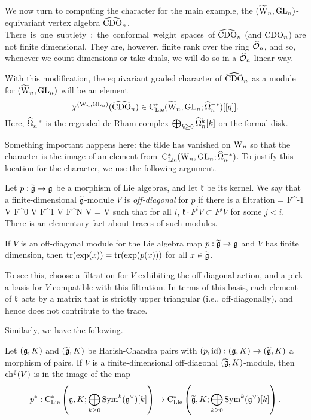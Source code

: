 \subsubsection{} 

We now turn to computing the character for the main example, 
the $(\widetilde{{{\rm W}}}_n,{\rm GL}_n)$-equivariant vertex algebra $\widehat{\rm CDO}_n$. 
\si
There is one subtlety: the conformal weight spaces of $\widehat{\rm CDO}_n$ (and ${\rm CDO}_n$) are not finite dimensional. 
They are, however, finite rank over the ring $\widehat{\mathcal O}_n$, 
and so, whenever we count dimensions or take duals, we will do so in a $\widehat{\mathcal O}_n$-linear way.

With this modification, the equivariant graded character of $\widehat{\rm CDO}_n$ as a module for $(\widetilde{{{\rm W}}}_n, {\rm GL}_n)$ will be an element 
\[
\chi^{({{\rm W}_n}, {\rm GL}_n)} (\widehat{\rm CDO}_n) \in {\rm C}_{{\rm Lie}}^*(\widetilde{{{\rm W}}}_n , {\rm GL}_n ; \widehat{\Omega}^{-*}_n)[[q]]. 
\]
Here, $\widehat{\Omega}^{-*}_n$ is the regraded de Rham complex $\bigoplus_{k \geq 0} \widehat{\Omega}^k_n [k]$ on the formal disk.  

Something important happens here: the tilde has vanished on ${{\rm W}_n}$ so that the character is the image of an element from~${\rm C}_{{\rm Lie}}^*({{\rm W}_n} , {\rm GL}_n ; \widehat{\Omega}^{-*}_n)$.
To justify this location for the character, we use the following argument.

Let $p : \widetilde{\mathfrak g} \to \mathfrak g$ be a morphism of Lie algebras, and let $\mathfrak{k}$ be its kernel. 
We say that a finite-dimensional $\widetilde{\mathfrak g}$-module $V$ is {\em off-diagonal} for $p$ if there is a filtration 
 = F^{-1} V \subset F^0 V \subset F^1 V \subset \cdots \subset F^N V = V
\een
such that for all $i$, $\mathfrak{k} \cdot F^i V \subset F^{j} V$ for some $j < i$. 
There is an elementary fact about traces of such modules.

\begin{lemma}
If $V$ is an off-diagonal module for the Lie algebra map $p : \widetilde{\mathfrak g} \to \mathfrak g$ and $V$ has finite dimension, 
then ${\rm tr}(\exp(x)) = \operatorname{tr}(\exp(p(x)))$ for all $x \in \widetilde{\mathfrak g}$. 
\end{lemma}

To see this, choose a filtration for $V$ exhibiting the off-diagonal action, and a pick a basis for $V$ compatible with this filtration. 
In terms of this basis, each element of $\frak{k}$ acts by a matrix that is strictly upper triangular (i.e., off-diagonally), and hence does not contribute to the trace. 

Similarly, we have the following.

\begin{lemma}\label{lem: offdiag}
Let $(\mathfrak g, K)$ and $(\widetilde{\mathfrak g}, K)$ be Harish-Chandra pairs with $(p, {\rm id}) : (\mathfrak g, K) \to (\widetilde{\mathfrak g}, K)$ a morphism of pairs. 
If $V$ is a finite-dimensional off-diagonal $(\widetilde{\mathfrak g},K)$-module,
then ${\rm ch}^\mathfrak g(V)$ is in the image of the map
\[
p^* : {\rm C}_{{\rm Lie}}^*\left(\mathfrak g,K ; \bigoplus_{k \geq 0} {\rm Sym}^k (\mathfrak g^\vee)[k]\right) \to  {\rm C}_{{\rm Lie}}^*\left(\widetilde{\mathfrak g},K ; \bigoplus_{k \geq 0} {\rm Sym}^k (\mathfrak g^\vee)[k]\right) .
\]
\end{lemma}

